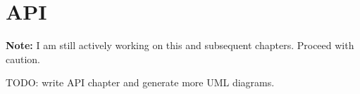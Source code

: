 \chapter{API}
\label{chapter:api}

\textbf{Note:} I am still actively working on this and subsequent chapters.
Proceed with caution.

TODO: write API chapter and generate more UML diagrams.